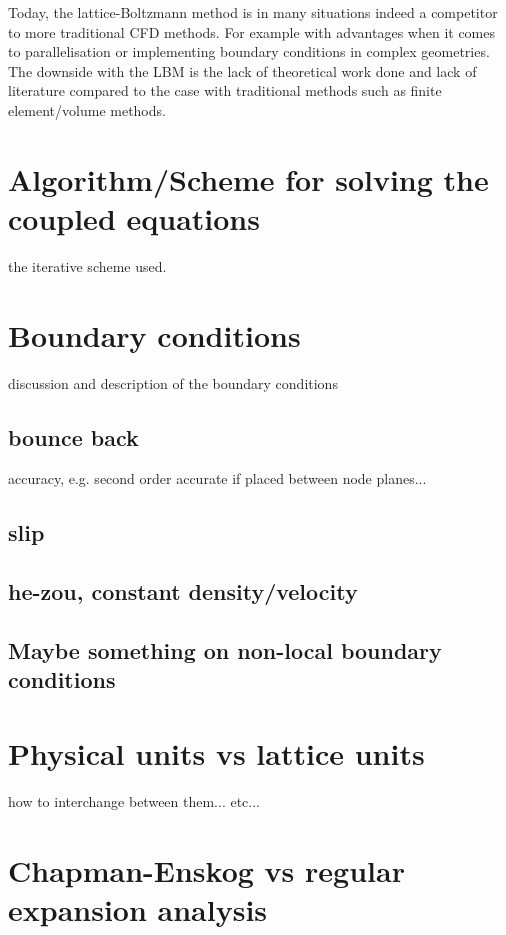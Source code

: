 Today, the lattice-Boltzmann method is in many situations indeed a
competitor to more traditional CFD methods. For example with
advantages when it comes to parallelisation or implementing boundary
conditions in complex geometries. The downside with the LBM is the
lack of theoretical work done and lack of literature compared to the
case with traditional methods such as finite element/volume
methods. \cite{junk-asym}

















\section{Algorithm/Scheme for solving the coupled equations}
the iterative scheme used.

\section{Boundary conditions}\label{sec:lbm:bound}
discussion and description of the boundary conditions
\subsection{bounce back}
accuracy, e.g. second order accurate if placed between node planes...
\subsection{slip}
\subsection{he-zou, constant density/velocity}
\subsection{Maybe something on non-local boundary conditions}

\section{Physical units vs lattice units}
how to interchange between them... etc...

\section{Chapman-Enskog vs regular expansion analysis}
